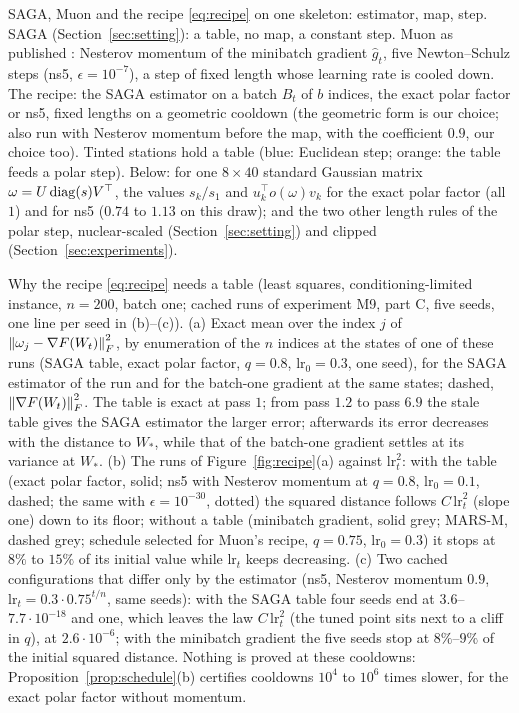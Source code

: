 \begin{explfigure}
\caption{SAGA, Muon and the recipe \eqref{eq:recipe} on one skeleton: estimator, map, step. SAGA (Section~\ref{sec:setting}): a table, no map, a constant step. Muon as published \cite{jordan2024muon}: Nesterov momentum of the minibatch gradient $\hat g_t$, five Newton--Schulz steps (ns5, $\epsilon=10^{-7}$), a step of fixed length whose learning rate is cooled down. The recipe: the SAGA estimator on a batch $B_t$ of $b$ indices, the exact polar factor or ns5, fixed lengths on a geometric cooldown (the geometric form is our choice; also run with Nesterov momentum before the map, with the coefficient $0.9$, our choice too). Tinted stations hold a table (blue: Euclidean step; orange: the table feeds a polar step). Below: for one $8\times40$ standard Gaussian matrix $\omega=U\diag(s)V^\top$, the values $s_k/s_1$ and $u_k^\top o(\omega)v_k$ for the exact polar factor (all $1$) and for ns5 ($0.74$ to $1.13$ on this draw); and the two other length rules of the polar step, nuclear-scaled (Section~\ref{sec:setting}) and clipped (Section~\ref{sec:experiments}).}\label{fig:pipeline}
\end{explfigure}

\begin{explfigure}
\caption{Why the recipe \eqref{eq:recipe} needs a table (least squares, conditioning-limited instance, $n=200$, batch one; cached runs of experiment M9, part C, five seeds, one line per seed in (b)--(c)). (a) Exact mean over the index $j$ of $\nF{\omega_j-\nabla F(W_t)}^2$, by enumeration of the $n$ indices at the states of one of these runs (SAGA table, exact polar factor, $q=0.8$, $\mathrm{lr}_0=0.3$, one seed), for the SAGA estimator of the run and for the batch-one gradient at the same states; dashed, $\nF{\nabla F(W_t)}^2$. The table is exact at pass $1$; from pass $1.2$ to pass $6.9$ the stale table gives the SAGA estimator the larger error; afterwards its error decreases with the distance to $W_\ast$, while that of the batch-one gradient settles at its variance at $W_\ast$. (b) The runs of Figure~\ref{fig:recipe}(a) against $\mathrm{lr}_t^2$: with the table (exact polar factor, solid; ns5 with Nesterov momentum at $q=0.8$, $\mathrm{lr}_0=0.1$, dashed; the same with $\epsilon=10^{-30}$, dotted) the squared distance follows $C\,\mathrm{lr}_t^2$ (slope one) down to its floor; without a table (minibatch gradient, solid grey; MARS-M, dashed grey; schedule selected for Muon's recipe, $q=0.75$, $\mathrm{lr}_0=0.3$) it stops at $8\%$ to $15\%$ of its initial value while $\mathrm{lr}_t$ keeps decreasing. (c) Two cached configurations that differ only by the estimator (ns5, Nesterov momentum $0.9$, $\mathrm{lr}_t=0.3\cdot0.75^{t/n}$, same seeds): with the SAGA table four seeds end at $3.6$--$7.7\cdot10^{-18}$ and one, which leaves the law $C\,\mathrm{lr}_t^2$ (the tuned point sits next to a cliff in $q$), at $2.6\cdot10^{-6}$; with the minibatch gradient the five seeds stop at $8\%$--$9\%$ of the initial squared distance. Nothing is proved at these cooldowns: Proposition~\ref{prop:schedule}(b) certifies cooldowns $10^4$ to $10^6$ times slower, for the exact polar factor without momentum.}\label{fig:recipe-table}
\end{explfigure}
